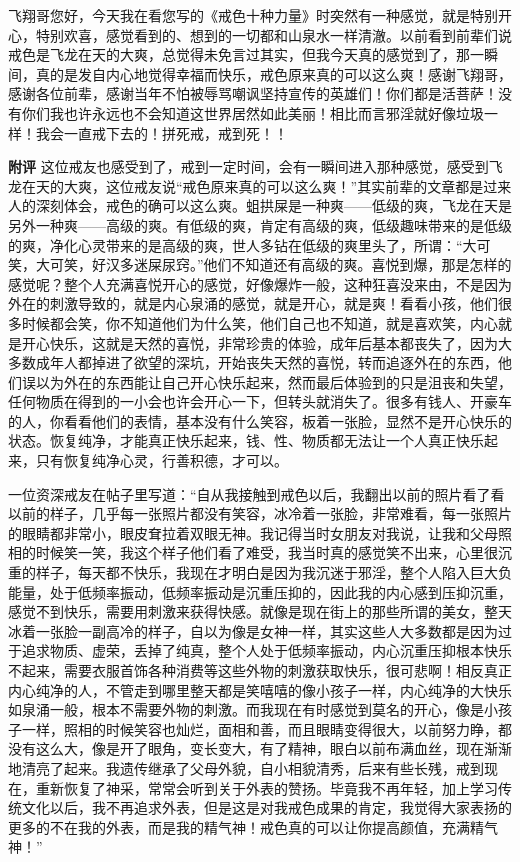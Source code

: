 \begin{case}
    飞翔哥您好，今天我在看您写的《戒色十种力量》时突然有一种感觉，就是特别开心，特别欢喜，感觉看到的、想到的一切都和山泉水一样清澈。以前看到前辈们说戒色是飞龙在天的大爽，总觉得未免言过其实，但我今天真的感觉到了，那一瞬间，真的是发自内心地觉得幸福而快乐，戒色原来真的可以这么爽！感谢飞翔哥，感谢各位前辈，感谢当年不怕被辱骂嘲讽坚持宣传的英雄们！你们都是活菩萨！没有你们我也许永远也不会知道这世界居然如此美丽！相比而言邪淫就好像垃圾一样！我会一直戒下去的！拼死戒，戒到死！！

    \textbf{附评} 这位戒友也感受到了，戒到一定时间，会有一瞬间进入那种感觉，感受到飞龙在天的大爽，这位戒友说“戒色原来真的可以这么爽！”其实前辈的文章都是过来人的深刻体会，戒色的确可以这么爽。蛆拱屎是一种爽——低级的爽，飞龙在天是另外一种爽——高级的爽。有低级的爽，肯定有高级的爽，低级趣味带来的是低级的爽，净化心灵带来的是高级的爽，世人多钻在低级的爽里头了，所谓：“大可笑，大可笑，好汉多迷屎尿窍。”他们不知道还有高级的爽。喜悦到爆，那是怎样的感觉呢？整个人充满喜悦开心的感觉，好像爆炸一般，这种狂喜没来由，不是因为外在的刺激导致的，就是内心泉涌的感觉，就是开心，就是爽！看看小孩，他们很多时候都会笑，你不知道他们为什么笑，他们自己也不知道，就是喜欢笑，内心就是开心快乐，这就是天然的喜悦，非常珍贵的体验，成年后基本都丧失了，因为大多数成年人都掉进了欲望的深坑，开始丧失天然的喜悦，转而追逐外在的东西，他们误以为外在的东西能让自己开心快乐起来，然而最后体验到的只是沮丧和失望，任何物质在得到的一小会也许会开心一下，但转头就消失了。很多有钱人、开豪车的人，你看看他们的表情，基本没有什么笑容，板着一张脸，显然不是开心快乐的状态。恢复纯净，才能真正快乐起来，钱、性、物质都无法让一个人真正快乐起来，只有恢复纯净心灵，行善积德，才可以。

    一位资深戒友在帖子里写道：“自从我接触到戒色以后，我翻出以前的照片看了看以前的样子，几乎每一张照片都没有笑容，冰冷着一张脸，非常难看，每一张照片的眼睛都非常小，眼皮耷拉着双眼无神。我记得当时女朋友对我说，让我和父母照相的时候笑一笑，我这个样子他们看了难受，我当时真的感觉笑不出来，心里很沉重的样子，每天都不快乐，我现在才明白是因为我沉迷于邪淫，整个人陷入巨大负能量，处于低频率振动，低频率振动是沉重压抑的，因此我的内心感到压抑沉重，感觉不到快乐，需要用刺激来获得快感。就像是现在街上的那些所谓的美女，整天冰着一张脸一副高冷的样子，自以为像是女神一样，其实这些人大多数都是因为过于追求物质、虚荣，丢掉了纯真，整个人处于低频率振动，内心沉重压抑根本快乐不起来，需要衣服首饰各种消费等这些外物的刺激获取快乐，很可悲啊！相反真正内心纯净的人，不管走到哪里整天都是笑嘻嘻的像小孩子一样，内心纯净的大快乐如泉涌一般，根本不需要外物的刺激。而我现在有时感觉到莫名的开心，像是小孩子一样，照相的时候笑容也灿烂，面相和善，而且眼睛变得很大，以前努力睁，都没有这么大，像是开了眼角，变长变大，有了精神，眼白以前布满血丝，现在渐渐地清亮了起来。我遗传继承了父母外貌，自小相貌清秀，后来有些长残，戒到现在，重新恢复了神采，常常会听到关于外表的赞扬。毕竟我不再年轻，加上学习传统文化以后，我不再追求外表，但是这是对我戒色成果的肯定，我觉得大家表扬的更多的不在我的外表，而是我的精气神！戒色真的可以让你提高颜值，充满精气神！”


\end{case}

